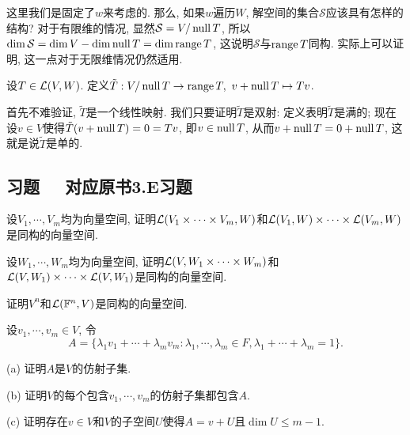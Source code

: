 这里我们是固定了$w$来考虑的. 那么, 如果$w$遍历$W$, 解空间的集合$\mathcal{S}$应该具有怎样的结构? 对于有限维的情况, 显然$\mathcal{S}=V/\operatorname{null} T$, 所以$\dim \mathcal{S} = \dim V - \dim \operatorname{null} T = \dim \operatorname{range} T$, 这说明$\mathcal{S}$与$\operatorname{range} T$同构. 实际上可以证明, 这一点对于无限维情况仍然适用. 

\begin{definition}{}
	设$T \in \mathcal{L} (V,W)$. 定义$\tilde{T}:V/\operatorname{null} T \to \operatorname{range} T,~v+\operatorname{null} T \mapsto Tv$. 
\end{definition}

首先不难验证, $\tilde{T}$是一个线性映射. 我们只要证明$\tilde{T}$是双射: 定义表明$\tilde{T}$是满的; 现在设$v \in V$使得$\tilde{T}(v+\operatorname{null} T)=0=Tv$, 即$v \in \operatorname{null} T$, 从而$v+\operatorname{null} T = 0 +\operatorname{null} T$, 这就是说$\tilde{T}$是单的. 

\subsection*{习题  ~~\small 对应原书3.E习题}

\begin{exercise} %
	设$V_1,\cdots ,V_m$均为向量空间, 证明$\mathcal{L} (V_1 \times \cdots \times V_m,W)$和$\mathcal{L} (V_1,W) \times \cdots \times \mathcal{L} (V_m,W)$是同构的向量空间. 
\end{exercise}
\vspace{1em}

\begin{exercise} %
	设$W_1,\cdots ,W_m$均为向量空间, 证明$\mathcal{L} (V, W_1 \times \cdots \times W_m)$和$\mathcal{L} (V,W_1) \times \cdots \times \mathcal{L} (V,W_1)$是同构的向量空间. 
\end{exercise}
\vspace{1em}

\begin{exercise} %
	证明$V^n$和$\mathcal{L} (\mathbb{F} ^n,V)$是同构的向量空间. 
\end{exercise}
\vspace{1em}

\begin{exercise} %
	设$v_1,\cdots ,v_m \in V$, 令$$A = \{ \lambda _1v_1+\cdots + \lambda _mv_m: \lambda _1,\cdots ,\lambda _m \in F, \lambda _1 + \cdots + \lambda _m=1 \}.$$
	
	(a) 证明$A$是$V$的仿射子集. 
	
	(b) 证明$V$的每个包含$v_1,\cdots ,v_m$的仿射子集都包含$A$. 
	
	(c) 证明存在$v \in V$和$V$的子空间$U$使得$A=v+U$且$\dim U \leq m-1$. 
\end{exercise}
\vspace{1em}

